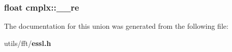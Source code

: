 \subsubsection{\setlength{\rightskip}{0pt plus 5cm}float {\bf cmplx::\_\-\_\-re}}\label{unioncmplx_d2ac1ebf7cfb8c7031aee0387cf5fdf8}




The documentation for this union was generated from the following file:\begin{CompactItemize}
\item 
utils/fft/{\bf essl.h}\end{CompactItemize}
